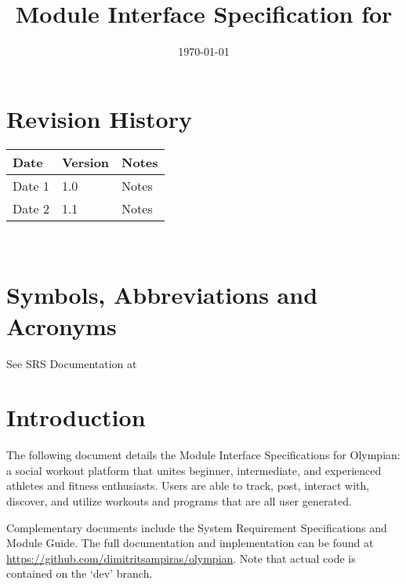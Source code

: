 \documentclass[12pt, titlepage]{article}
\begin{document}
\title{Module Interface Specification for \progname{}}

\author{\authname}

\date{\today}

\maketitle


\section{Revision History}

\begin{tabularx}{\textwidth}{p{3cm}p{2cm}X}
\toprule {\bf Date} & {\bf Version} & {\bf Notes}\\
\midrule
Date 1 & 1.0 & Notes\\
Date 2 & 1.1 & Notes\\
\bottomrule
\end{tabularx}

~\newpage

\section{Symbols, Abbreviations and Acronyms}

See SRS Documentation at 


\newpage

\tableofcontents

\newpage


\section{Introduction}

The following document details the Module Interface Specifications for Olympian: a social workout platform that unites beginner, intermediate, and experienced athletes and fitness enthusiasts. Users are able to track, post, interact with, discover, and utilize workouts and programs that are all user generated.

Complementary documents include the System Requirement Specifications
and Module Guide.  The full documentation and implementation can be
found at \url{https://github.com/dimitritsampiras/olympian}.
Note that actual code is contained on the `dev' branch.
\end{document}

